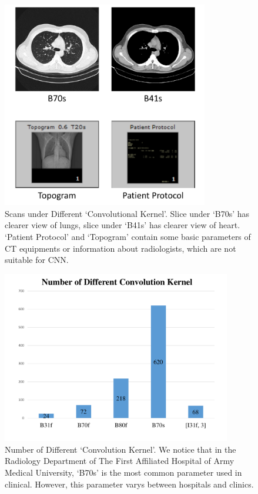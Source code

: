 \documentclass[journal]{IEEEtran}
\begin{document}
\begin{figure}[t]
    \centerline{\includegraphics[width=90mm]{Bs.pdf}}
    \vspace{-0cm}
    \caption{Scans under Different `Convolutional Kernel'. Slice under `B70s' has clearer view of lungs, slice under `B41s' has clearer view of heart. `Patient Protocol' and `Topogram' contain some basic parameters of CT equipments or information about radiologists, which are not suitable for CNN.}
    \vspace{-0cm}
    \label{Bs}
    \end{figure}

\begin{figure}[t]
    \centerline{\includegraphics[width=100mm]{NumberofDifferentConvolutionKernel.pdf}}
    \vspace{-0cm}
    \caption{Number of Different `Convolution Kernel'. We notice that in the Radiology Department of The First Affiliated Hospital of Army Medical University, `B70s' is the most common parameter used in clinical. However, this parameter varys between hospitals and clinics.}
    \vspace{-0cm}
    \label{NumberofDifferentConvolutionKernel}
    \end{figure}
\end{document}
